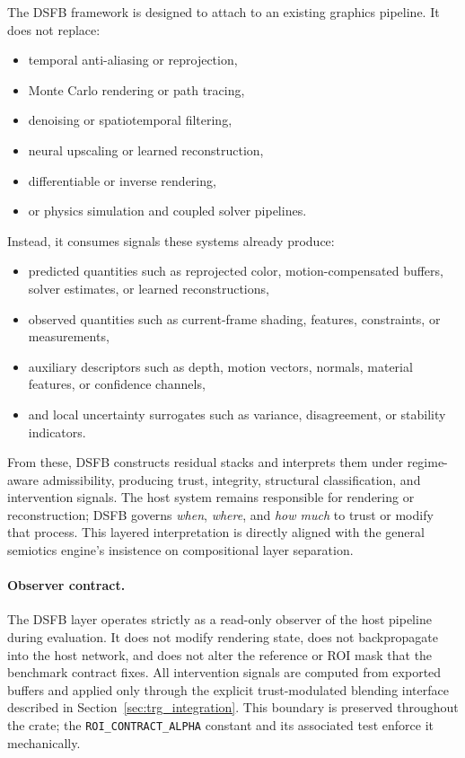 \documentclass[11pt]{article}
\theoremstyle{definition}
\theoremstyle{plain}
\begin{document}
The DSFB framework is designed to attach to an existing graphics pipeline. It does not replace:
\begin{itemize}[leftmargin=1.5em]
    \item temporal anti-aliasing or reprojection,
    \item Monte Carlo rendering or path tracing,
    \item denoising or spatiotemporal filtering,
    \item neural upscaling or learned reconstruction,
    \item differentiable or inverse rendering,
    \item or physics simulation and coupled solver pipelines.
\end{itemize}

Instead, it consumes signals these systems already produce:
\begin{itemize}[leftmargin=1.5em]
    \item predicted quantities such as reprojected color, motion-compensated buffers, solver estimates, or learned reconstructions,
    \item observed quantities such as current-frame shading, features, constraints, or measurements,
    \item auxiliary descriptors such as depth, motion vectors, normals, material features, or confidence channels,
    \item and local uncertainty surrogates such as variance, disagreement, or stability indicators.
\end{itemize}

From these, DSFB constructs residual stacks and interprets them under regime-aware admissibility, producing trust, integrity, structural classification, and intervention signals. The host system remains responsible for rendering or reconstruction; DSFB governs \emph{when}, \emph{where}, and \emph{how much} to trust or modify that process. This layered interpretation is directly aligned with the general semiotics engine’s insistence on compositional layer separation. 


\paragraph{Observer contract.}
The DSFB layer operates strictly as a read-only observer of the host pipeline during evaluation. It does not modify rendering state, does not backpropagate into the host network, and does not alter the reference or ROI mask that the benchmark contract fixes. All intervention signals are computed from exported buffers and applied only through the explicit trust-modulated blending interface described in Section~\ref{sec:trg_integration}. This boundary is preserved throughout the crate; the \texttt{ROI\_CONTRACT\_ALPHA} constant and its associated test enforce it mechanically.
\end{document}
